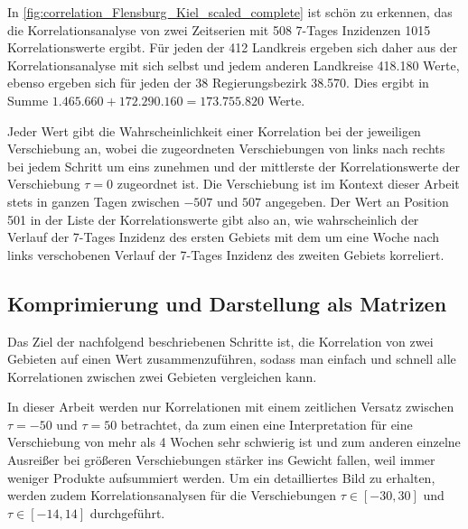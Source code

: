 In \autoref{fig:correlation_Flensburg_Kiel_scaled_complete} ist schön zu erkennen, das die Korrelationsanalyse von zwei Zeitserien mit 508 7-Tages Inzidenzen 1015 Korrelationswerte ergibt.
Für jeden der 412 Landkreis ergeben sich daher aus der Korrelationsanalyse mit sich selbst und jedem anderen Landkreise 418.180 Werte, ebenso ergeben sich für jeden der 38 Regierungsbezirk 38.570. Dies ergibt in Summe $
1.465.660+172.290.160=173.755.820$ Werte.

Jeder Wert gibt die Wahrscheinlichkeit einer Korrelation bei der jeweiligen Verschiebung an, wobei die zugeordneten Verschiebungen von links nach rechts bei jedem Schritt um eins zunehmen und der mittlerste der Korrelationswerte der Verschiebung $\tau = 0$ zugeordnet ist. Die Verschiebung ist im Kontext dieser Arbeit stets in ganzen Tagen zwischen $-507$ und $507$ angegeben. Der Wert an Position 501 in der Liste der Korrelationswerte gibt also an, wie wahrscheinlich der Verlauf der 7-Tages Inzidenz des ersten Gebiets mit dem um eine Woche nach links verschobenen Verlauf der 7-Tages Inzidenz des zweiten Gebiets korreliert.


\subsection{Komprimierung und Darstellung als Matrizen}\label{sec:Grundlagen:Korrelation:Komprimierung}
Das Ziel der nachfolgend beschriebenen Schritte ist, die Korrelation von zwei Gebieten auf einen Wert zusammenzuführen, sodass man einfach und schnell alle Korrelationen zwischen zwei Gebieten vergleichen kann.

In dieser Arbeit werden nur Korrelationen mit einem zeitlichen Versatz zwischen $\tau=-50$ und $\tau=50$ betrachtet, da zum einen eine Interpretation für eine Verschiebung von mehr als 4 Wochen sehr schwierig ist und zum anderen einzelne Ausreißer bei größeren Verschiebungen stärker ins Gewicht fallen, weil immer weniger Produkte aufsummiert werden.
Um ein detailliertes Bild zu erhalten, werden zudem Korrelationsanalysen für die Verschiebungen $\tau\in[-30,30]$ und $\tau\in[-14,14]$ durchgeführt.


